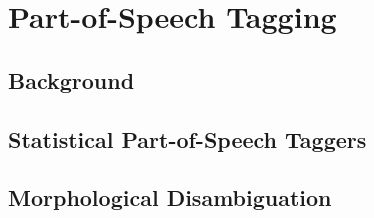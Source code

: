 \chapter{Part-of-Speech Tagging}
\section{Background}
\section{Statistical Part-of-Speech Taggers}
\section{Morphological Disambiguation}
